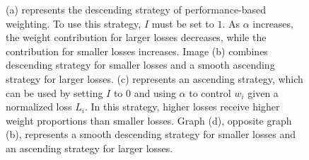 \begin{figure}[H]
  \caption[Performance based strategy]{(a) represents the descending strategy of performance-based weighting. To use this strategy, $I$ must be set to $1$. As $\alpha$ increases, the weight contribution for larger losses decreases, while the contribution for smaller losses increases. Image (b) combines descending strategy for smaller losses and a smooth ascending strategy for larger losses. (c) represents an ascending strategy, which can be used by setting $I$ to $0$ and using $\alpha$ to control $w_i$ given a normalized loss $L_i$. In this strategy, higher losses receive higher weight proportions than smaller losses. Graph (d), opposite graph (b), represents a smooth descending strategy for smaller losses and an ascending strategy for larger losses.}
  \label{annealing}
\end{figure}


